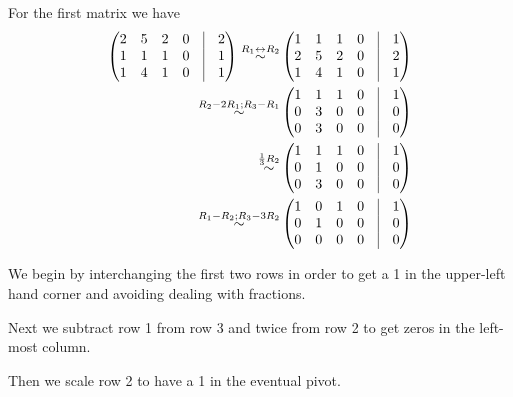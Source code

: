 {For the first matrix we have
\begin{align*}
\begin{pmatrix}
2 & 5 & 2 & 0 & \vline & 2 \\
1 & 1 & 1 & 0 & \vline & 1 \\
1 & 4 & 1 & 0 & \vline & 1
\end{pmatrix}
\overset{R_1 \leftrightarrow R_2}{\sim} &
\begin{pmatrix}
1 & 1 & 1 & 0 & \vline & 1 \\
2 & 5 & 2 & 0 & \vline & 2 \\
1 & 4 & 1 & 0 & \vline & 1
\end{pmatrix}
\\ \overset{R_2 - 2 R_1 ; R_3 - R_1}{\sim} &
\begin{pmatrix}
1 & 1 & 1 & 0 & \vline & 1 \\
0 & 3 & 0 & 0 & \vline & 0 \\
0 & 3 & 0 & 0 & \vline & 0
\end{pmatrix}
\\ \overset{\frac{1}{3}R_2}{\sim} &
\begin{pmatrix}
1 & 1 & 1 & 0 & \vline & 1 \\
0 & 1 & 0 & 0 & \vline & 0 \\
0 & 3 & 0 & 0 & \vline & 0
\end{pmatrix}
\\ \overset{R_1 - R_2 ; R_3 - 3 R_2}{\sim} &
\begin{pmatrix}
1 & 0 & 1 & 0 & \vline & 1 \\
0 & 1 & 0 & 0 & \vline & 0 \\
0 & 0 & 0 & 0 & \vline & 0
\end{pmatrix}
\end{align*}
\begin{enumext}[label=\arabic*,wrap-label=#1.]
\item We begin by interchanging the first two rows in order to get a 1 in the upper-left hand corner and avoiding dealing with fractions.

\item Next we subtract row 1 from row 3 and twice from row 2 to get zeros in the left-most column.

\item Then we scale row 2 to have a 1 in the eventual pivot.


\end{enumext}}
